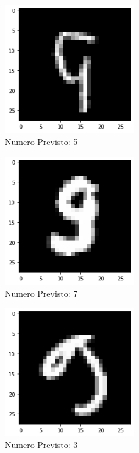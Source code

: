 \documentclass[12pt, a4paper]{article}
\begin{document}
\begin{figure}[H]
    \centering
    \caption{Numero Previsto: 5}
    \includegraphics[width=0.50\textwidth]{nove1.png}
\end{figure}
\begin{figure}[H]
    \centering
    \caption{Numero Previsto: 7}
    \includegraphics[width=0.50\textwidth]{nove2.png}
\end{figure}
\begin{figure}[H]
    \centering
    \caption{Numero Previsto: 3}
    \includegraphics[width=0.50\textwidth]{nove3.png}
\end{figure}
\end{document}
